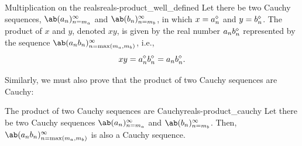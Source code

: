 \begin{df}{Multiplication on the reals}{reals-product_well_defined}
  Let there be two Cauchy sequences, $\sequence{a_n}{n = m_a}{\infty}$ and
  $\sequence{b_n}{n = m_b}{\infty}$, in which $x = a_n^{\diamond}$ and $y = b_n^{\diamond}$.
  The product of $x$ and $y$, denoted $xy$, is given by the real number $a_n b_n^{\diamond}$
  represented by the sequence $\sequence{a_n b_n}{n = \max(m_a, m_b)}{\infty}$, i.e.,
  \begin{equation}
    xy = a_n^{\diamond}b_n^{\diamond} = a_n b_n^{\diamond}.
  \end{equation}
\end{df}
Similarly, we must also prove that the product of two Cauchy sequences are Cauchy:
\begin{lemma}{The product of two Cauchy sequences are Cauchy}{reals-product_cauchy}
  Let there be two Cauchy sequences $\sequence{a_n}{n = m_a}{\infty}$ and
  $\sequence{b_n}{n = m_b}{\infty}$. Then, $\sequence{a_n b_n}{n = \max(m_a, m_b)}{\infty}$
  is also a Cauchy sequence.
\end{lemma}
